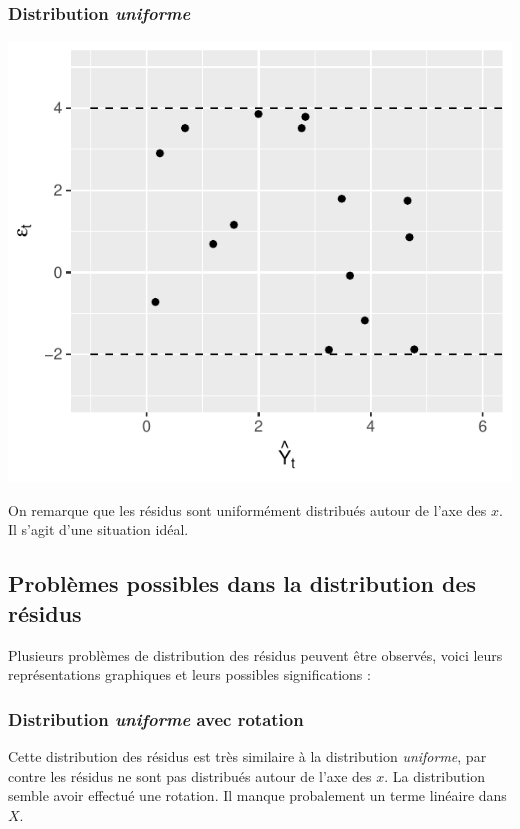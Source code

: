 \documentclass[11pt,french]{report}
\begin{document}
\subsubsection*{Distribution \emph{uniforme}}
\includegraphics{notes_de_cours-031}

\bigskip
On remarque que les résidus sont uniformément distribués autour de l'axe des $x$. Il s'agit d'une situation idéal.

\subsection{Problèmes possibles dans la distribution des résidus}
Plusieurs problèmes de distribution des résidus peuvent être observés, voici leurs représentations graphiques et leurs possibles significations :

\subsubsection{Distribution \emph{uniforme} avec rotation}
Cette distribution des résidus est très similaire à la distribution \emph{uniforme}, par contre les résidus ne sont pas distribués autour de l'axe des $x$. La distribution semble avoir effectué une rotation. Il manque probalement un terme linéaire dans $X$.
\end{document}
